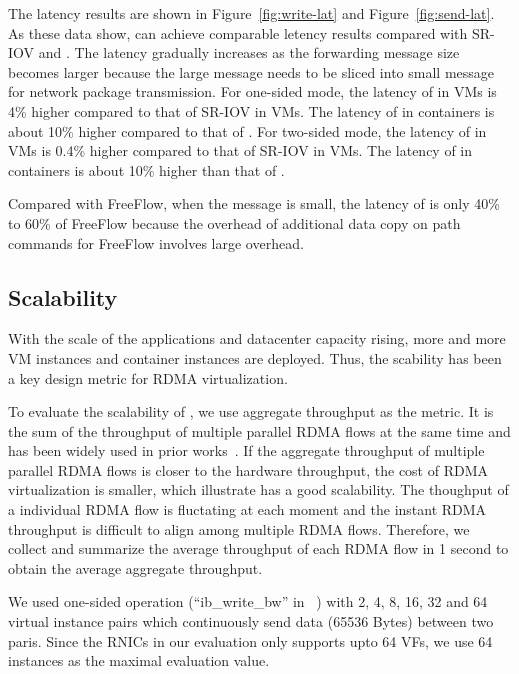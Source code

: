 The latency results are shown in Figure~\ref{fig:write-lat} and Figure~\ref{fig:send-lat}. As these data show, \sys can achieve comparable letency results compared with SR-IOV and \native. The latency gradually increases as the forwarding message size becomes larger because the large message needs to be sliced into small message for network package transmission.
For one-sided mode, the latency of \sys in VMs is 4\% higher compared to that of SR-IOV in VMs. The latency of \sys in containers is about 10\% higher compared to that of \native. For two-sided mode, the latency of \sys in VMs is 0.4\% higher compared to that of SR-IOV in VMs. The latency of \sys in containers is about 10\% higher than that of \native.

Compared with FreeFlow, when the message is small, the latency of \sys is only 40\% to 60\% of FreeFlow because the overhead of additional data copy on path commands for FreeFlow involves large overhead. 





\subsection{Scalability}

With the scale of the applications and datacenter capacity rising, more and more VM instances and container instances are deployed. Thus, the scability has been a key design metric for RDMA virtualization.

To evaluate the scalability of \sys, we use aggregate throughput as the metric. It is the sum of the throughput of multiple parallel RDMA flows at the same time and has been widely used in prior works~\cite{kim2019freeflow, pfefferle2015hybrid, he2020masq}. If the aggregate throughput of multiple parallel RDMA flows is closer to the hardware throughput, the cost of RDMA virtualization is smaller, which illustrate \sys has a good scalability. The thoughput of a individual RDMA flow is fluctating at each moment and the instant RDMA throughput is difficult to align among multiple RDMA flows. Therefore, we collect and summarize the average throughput of each RDMA flow in 1 second to obtain the average aggregate throughput.

We used one-sided operation (``ib\_write\_bw'' in ~\cite{perftest}) with 2, 4, 8, 16, 32 and 64 virtual instance pairs which continuously send data (65536 Bytes) between two paris. Since the RNICs in our evaluation only supports upto 64 VFs, we use 64 instances as the maximal evaluation value.

